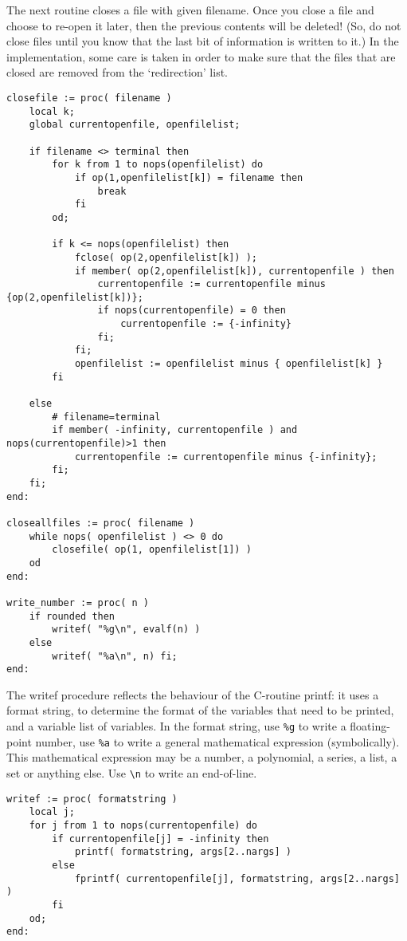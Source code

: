 \documentclass[a4paper,10pt]{article}
\begin{document}
The next routine closes a file with given filename.  Once you close a file and choose
to re-open it later, then the previous contents will be deleted! (So, do not close files
until you know that the last bit of information is written to it.)
In the implementation, some care is taken in order to make sure that the files that
are closed are removed from the `redirection' list.

\begin{lstlisting}[name=tools]
closefile := proc( filename )
    local k;
    global currentopenfile, openfilelist;

    if filename <> terminal then
        for k from 1 to nops(openfilelist) do
            if op(1,openfilelist[k]) = filename then
                break
            fi
        od;

        if k <= nops(openfilelist) then
            fclose( op(2,openfilelist[k]) );
            if member( op(2,openfilelist[k]), currentopenfile ) then
                currentopenfile := currentopenfile minus {op(2,openfilelist[k])};
                if nops(currentopenfile) = 0 then
                    currentopenfile := {-infinity}
                fi;
            fi;
            openfilelist := openfilelist minus { openfilelist[k] }
        fi

    else
        # filename=terminal
        if member( -infinity, currentopenfile ) and nops(currentopenfile)>1 then
            currentopenfile := currentopenfile minus {-infinity};
        fi;
    fi;
end:

closeallfiles := proc( filename )
    while nops( openfilelist ) <> 0 do
        closefile( op(1, openfilelist[1]) )
    od
end:

write_number := proc( n )
    if rounded then
        writef( "%g\n", evalf(n) )
    else
        writef( "%a\n", n) fi;
end:
\end{lstlisting}

The writef procedure reflects the behaviour of the C-routine printf:  it uses
a format string, to determine the format of the variables that need to be
printed, and a variable list of variables.  In the format string, use \verb+%g+ to write
a floating-point number, use \verb+%a+ to write a general mathematical expression (symbolically).
This mathematical expression may be a number, a polynomial, a series, a list, a set or anything else.
Use \verb+\n+ to write an end-of-line.

\begin{lstlisting}[name=tools]
writef := proc( formatstring )
    local j;
    for j from 1 to nops(currentopenfile) do
        if currentopenfile[j] = -infinity then
            printf( formatstring, args[2..nargs] )
        else
            fprintf( currentopenfile[j], formatstring, args[2..nargs] )
        fi
    od;
end:
\end{lstlisting}
\end{document}
